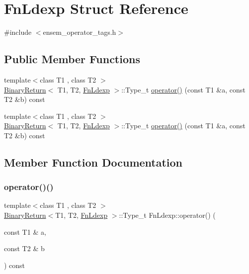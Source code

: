 \hypertarget{structFnLdexp}{}\section{Fn\+Ldexp Struct Reference}
\label{structFnLdexp}


{\ttfamily \#include $<$ensem\+\_\+operator\+\_\+tags.\+h$>$}

\subsection*{Public Member Functions}
\begin{DoxyCompactItemize}
\item 
{\footnotesize template$<$class T1 , class T2 $>$ }\\\mbox{\hyperlink{structBinaryReturn}{Binary\+Return}}$<$ T1, T2, \mbox{\hyperlink{structFnLdexp}{Fn\+Ldexp}} $>$\+::Type\+\_\+t \mbox{\hyperlink{structFnLdexp_af369e8f8d69893a25d9ea27c59ff4d02}{operator()}} (const T1 \&a, const T2 \&b) const
\item 
{\footnotesize template$<$class T1 , class T2 $>$ }\\\mbox{\hyperlink{structBinaryReturn}{Binary\+Return}}$<$ T1, T2, \mbox{\hyperlink{structFnLdexp}{Fn\+Ldexp}} $>$\+::Type\+\_\+t \mbox{\hyperlink{structFnLdexp_af369e8f8d69893a25d9ea27c59ff4d02}{operator()}} (const T1 \&a, const T2 \&b) const
\end{DoxyCompactItemize}


\subsection{Member Function Documentation}
\mbox{\label{structFnLdexp_af369e8f8d69893a25d9ea27c59ff4d02}} 
\subsubsection{\texorpdfstring{operator()()}{operator()()}\hspace{0.1cm}{\footnotesize\ttfamily [1/2]}}
{\footnotesize\ttfamily template$<$class T1 , class T2 $>$ \\
\mbox{\hyperlink{structBinaryReturn}{Binary\+Return}}$<$T1, T2, \mbox{\hyperlink{structFnLdexp}{Fn\+Ldexp}} $>$\+::Type\+\_\+t Fn\+Ldexp\+::operator() (\begin{DoxyParamCaption}\item[{const T1 \&}]{a,  }\item[{const T2 \&}]{b }\end{DoxyParamCaption}) const\hspace{0.3cm}{\ttfamily [inline]}}

